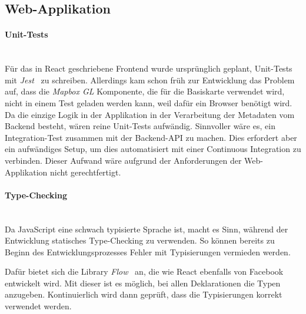 \subsection{Web-Applikation}
\label{tests:Web-Applikation}

\paragraph{Unit-Tests}~\\
Für das in React geschriebene Frontend wurde ursprünglich geplant, Unit-Tests mit \emph{Jest}~\cite{jest} zu schreiben.
Allerdings kam schon früh zur Entwicklung das Problem auf, dass die \emph{Mapbox GL} Komponente, die für die Basiskarte verwendet wird, nicht in einem Test geladen werden kann, weil dafür ein Browser benötigt wird.
Da die einzige Logik in der Applikation in der Verarbeitung der Metadaten vom Backend besteht, wären reine Unit-Tests aufwändig.
Sinnvoller wäre es, ein Integration-Test zusammen mit der Backend-API zu machen.
Dies erfordert aber ein aufwändiges Setup, um dies automatisiert mit einer Continuous Integration zu verbinden.
Dieser Aufwand wäre aufgrund der Anforderungen der Web-Applikation nicht gerechtfertigt.

\paragraph{Type-Checking}~\\
Da JavaScript eine schwach typisierte Sprache ist, macht es Sinn, während der Entwicklung statisches Type-Checking zu verwenden.
So können bereits zu Beginn des Entwicklungsprozesses Fehler mit Typisierungen vermieden werden.

Dafür bietet sich die Library \emph{Flow}~\cite{flow} an, die wie React ebenfalls von Facebook entwickelt wird.
Mit dieser ist es möglich, bei allen Deklarationen die Typen anzugeben.
Kontinuierlich wird dann geprüft, dass die Typisierungen korrekt verwendet werden.
